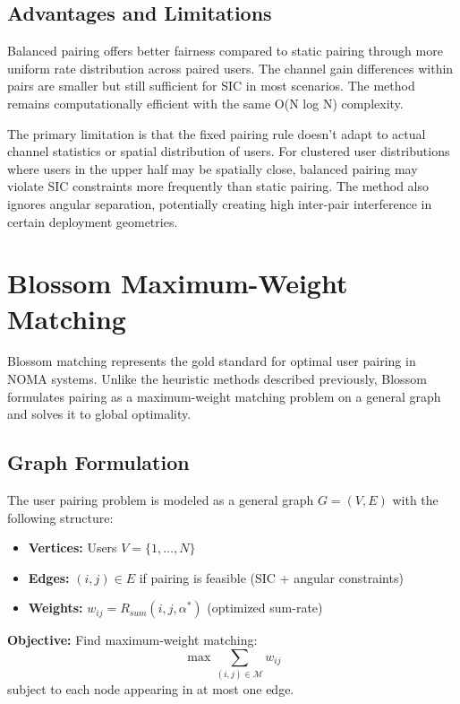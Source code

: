 \subsection{Advantages and Limitations}

Balanced pairing offers better fairness compared to static pairing through more uniform rate distribution across paired users. The channel gain differences within pairs are smaller but still sufficient for SIC in most scenarios. The method remains computationally efficient with the same O(N log N) complexity.

The primary limitation is that the fixed pairing rule doesn't adapt to actual channel statistics or spatial distribution of users. For clustered user distributions where users in the upper half may be spatially close, balanced pairing may violate SIC constraints more frequently than static pairing. The method also ignores angular separation, potentially creating high inter-pair interference in certain deployment geometries.

\section{Blossom Maximum-Weight Matching}

Blossom matching represents the gold standard for optimal user pairing in NOMA systems. Unlike the heuristic methods described previously, Blossom formulates pairing as a maximum-weight matching problem on a general graph and solves it to global optimality.

\subsection{Graph Formulation}

The user pairing problem is modeled as a general graph $G = (V, E)$ with the following structure:

\begin{itemize}
    \item \textbf{Vertices:} Users $V = \{1, \ldots, N\}$
    \item \textbf{Edges:} $(i,j) \in E$ if pairing is feasible (SIC + angular constraints)
    \item \textbf{Weights:} $w_{ij} = R_{sum}(i,j,\alpha^*)$ (optimized sum-rate)
\end{itemize}

\textbf{Objective:} Find maximum-weight matching:
\begin{equation}
\max \sum_{(i,j) \in \mathcal{M}} w_{ij}
\end{equation}
subject to each node appearing in at most one edge.

